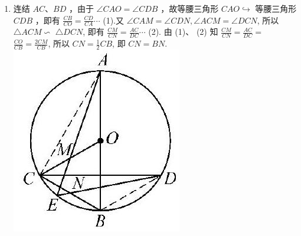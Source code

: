 \documentclass[10pt]{article}
\begin{document}
\begin{enumerate}
(第 5 题)\\
$\angle A B E=\angle A E B=\angle A D B+\angle D B E$ ，于是 $\angle E B C=\angle D B E$ ，所以 $\angle C A D=$ $\angle D B C=\angle D B E+\angle E B C=2 \angle D B E$. （2）由 $\angle F B A=\angle A C F=$ $\angle B D E, \angle B A F=\angle D A B$ ，可得 $\triangle B A F \backsim \triangle D A B$ ，从而 $A B^{2}=A D \cdot A F$ ，于是 $A D^{2}-A B^{2}=A D(A D-A F)=A D \cdot D F \cdots$ (1).又 $\angle B D F=\angle A D C$, $\angle D B F=\angle D A C$ ，故 $\triangle B D F \backsim \triangle A D C$ ，所以 $A D \cdot D F=B D \cdot D C \cdots(2)$ 。由 (1)、(2) 知 $A D^{2}-A B^{2}=B D \cdot D C$ 。
  \item 连结 $A C 、 B D$ ，由于 $\angle C A O=\angle C D B$ ，故等腰三角形 $C A O \hookrightarrow$ 等腰三角形 $C D B$ ，即有 $\frac{C B}{C O}=\frac{C D}{C A} \cdots$ (1).又 $\angle C A M=\angle C D N, \angle A C M=\angle D C N$, 所以 $\triangle A C M \backsim$ $\triangle D C N$, 即有 $\frac{C M}{C N}=\frac{A C}{D C} \cdots$ (2). 由 (1)、 (2) 知 $\frac{C M}{C N}=\frac{A C}{D C}=$ $\frac{C O}{C B}=\frac{2 C M}{C B}$, 所以 $C N=\frac{1}{2} C B$, 即 $C N=B N$.\\
\includegraphics[max width=\textwidth, center]{2024_10_30_66b8e5e701da2093c133g-090(3)}\\

\end{enumerate}
\end{document}
